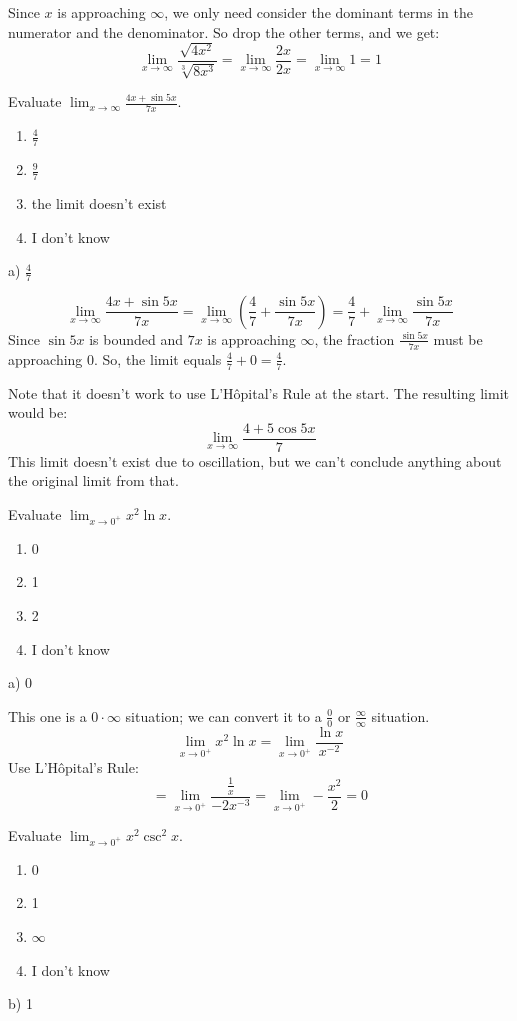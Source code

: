 \documentclass[addpoints,12pt,answers]{exam}
\begin{document}
\begin{questions}
\begin{solution}
    Since $x$ is approaching $\infty$, we only need consider the dominant terms in the numerator and the denominator. So drop the other terms, and we get:
    $$\lim_{x\to\infty}\frac{\sqrt{4x^2}}{\sqrt[3]{8x^3}}=\lim_{x\to\infty}\frac{2x}{2x}=\lim_{x\to\infty} 1=1$$
  \end{solution}
  \newpage
  \question
  Evaluate $\displaystyle\lim_{x\to\infty}\frac{4x+\sin 5x}{7x}$.
  \begin{enumerate}[label=\alph*)]
    \item
    $\displaystyle\frac{4}{7}$
    \item
    $\displaystyle\frac{9}{7}$
    \item
    the limit doesn't exist
    \item
    I don't know
  \end{enumerate}
  \begin{solution}
    a) $\displaystyle\frac{4}{7}$
    
    $$\lim_{x\to\infty}\frac{4x+\sin 5x}{7x}=\lim_{x\to\infty}\left(\frac{4}{7}+\frac{\sin 5x}{7x}\right)=\frac{4}{7}+\lim_{x\to\infty}\frac{\sin 5x}{7x}$$
    Since $\sin 5x$ is bounded and $7x$ is approaching $\infty$, the fraction $\displaystyle\frac{\sin 5x}{7x}$ must be approaching 0. So, the limit equals $\displaystyle\frac{4}{7}+0=\frac{4}{7}$.
    
    Note that it doesn't work to use L'H\^{o}pital's Rule at the start. The resulting limit would be:
    $$\lim_{x\to\infty}\frac{4+5\cos 5x}{7}$$
    This limit doesn't exist due to oscillation, but we can't conclude anything about the original limit from that.
  \end{solution}
  \newpage
  \question
  Evaluate $\displaystyle\lim_{x\to 0^+}x^2\ln x$.
  \begin{enumerate}[label=\alph*)]
    \item
    0
    \item
    1
    \item
    2
    \item
    I don't know
  \end{enumerate}
  \begin{solution}
    a) 0
    
    This one is a $0\cdot\infty$ situation; we can convert it to a $\displaystyle\frac{0}{0}$ or $\displaystyle\frac{\infty}{\infty}$ situation.
    $$\lim_{x\to 0^+}x^2\ln x=\lim_{x\to 0^+}\frac{\ln x}{x^{-2}}$$
    Use L'H\^{o}pital's Rule:
    $$=\lim_{x\to 0^+}\frac{\frac{1}{x}}{-2x^{-3}}=\lim_{x\to 0^+}-\frac{x^2}{2}=0$$
  \end{solution}
  \newpage
  \question
  Evaluate $\displaystyle\lim_{x\to 0^+}x^2\csc^2 x$.
  \begin{enumerate}[label=\alph*)]
    \item
    0
    \item
    1
    \item
    $\infty$
    \item
    I don't know
  \end{enumerate}
  \begin{solution}
    b) 1
    

\end{solution}
\end{questions}
\end{document}
